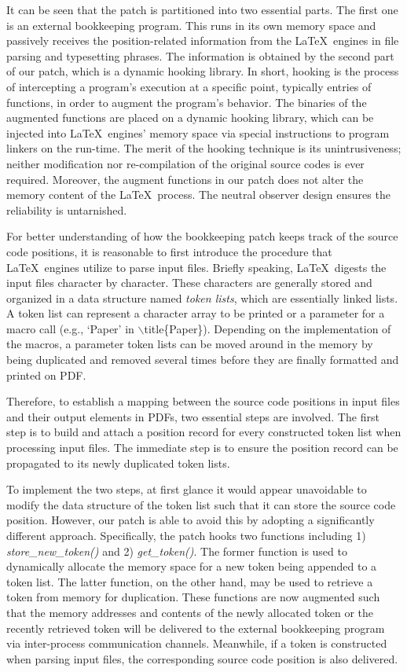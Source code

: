 \documentclass[sigconf]{acmart}
\begin{document}
It can be seen that the patch is partitioned into two essential parts. The first one is an external bookkeeping program. 
This runs in its own memory space and passively receives the position-related information from the \LaTeX\ engines in file parsing and typesetting phrases.
The information is obtained by the second part of our patch, which is a dynamic hooking library. 
In short, hooking is the process of intercepting a program's execution at a specific point, typically entries of functions, in order to augment the program's behavior. 
The binaries of the augmented functions are placed on a dynamic hooking library, which can be injected into \LaTeX\ engines' memory space via special instructions to program linkers on the run-time. 
The merit of the hooking technique is its unintrusiveness; neither modification nor re-compilation of the original source codes is ever required. 
Moreover, the augment functions in our patch does not alter the memory content of the \LaTeX\ process. The neutral observer design ensures the reliability is untarnished.

For better understanding of how the bookkeeping patch keeps track of the source code positions, it is reasonable to first introduce the procedure that \LaTeX\ engines utilize to parse input files. Briefly speaking, \LaTeX\ digests the input files character by character. 
These characters are generally stored and organized in a data structure named \textit{token lists}, which are essentially linked lists. 
A token list can represent a character array to be printed or a parameter for a macro call (e.g., `Paper' in $\backslash$title\{Paper\}). 
Depending on the implementation of the macros, a parameter token lists can be moved around in the memory by being duplicated and removed several times before they are finally formatted and printed on PDF.

Therefore, to establish a mapping between the source code positions in input files and their output elements in PDFs, two essential steps are involved. 
The first step is to build and attach a position record for every constructed token list when processing input files. 
The immediate step is to ensure the position record can be propagated to its newly duplicated token lists. 

To implement the two steps, at first glance it would appear unavoidable to modify the data structure of the token list such that it can store the source code position. 
However, our patch is able to avoid this by  adopting a significantly different approach. 
Specifically, the patch hooks two functions including 1) \textit{store\_new\_token()} and 2) \textit{get\_token()}. 
The former function  is used to dynamically allocate the memory space for a new token being appended to a token list. 
The latter function, on the other hand, may be used to retrieve a token from memory for duplication. 
These functions are now augmented such that the memory addresses and contents of the newly allocated token or the recently retrieved token will be delivered to the external bookkeeping program via inter-process communication channels. 
Meanwhile, if a token is constructed when parsing input files, the corresponding source code position is also delivered. 
\end{document}
